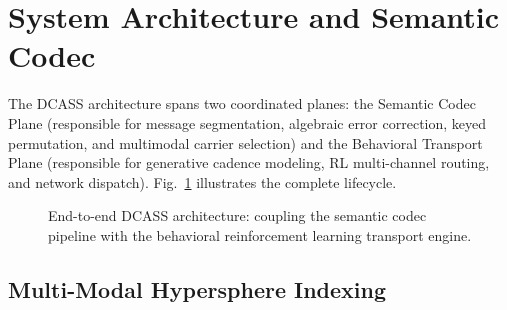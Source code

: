 \documentclass[conference]{IEEEtran}
\begin{document}
\section{System Architecture and Semantic Codec}

The DCASS architecture spans two coordinated planes: the Semantic Codec Plane (responsible for message segmentation, algebraic error correction, keyed permutation, and multimodal carrier selection) and the Behavioral Transport Plane (responsible for generative cadence modeling, RL multi-channel routing, and network dispatch). Fig.~\ref{fig:arch} illustrates the complete lifecycle.

\begin{figure}[t]
\centering
{}
\caption{End-to-end DCASS architecture: coupling the semantic codec pipeline with the behavioral reinforcement learning transport engine.}
\label{fig:arch}
\end{figure}

\subsection{Multi-Modal Hypersphere Indexing}
\end{document}
